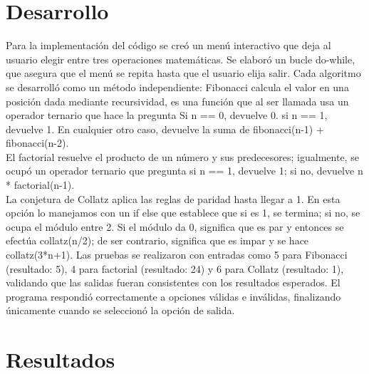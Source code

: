 \documentclass[letterpaper,12pt,oneside]{article}
\begin{document}
\section{Desarrollo}
Para la implementación del código se creó un menú interactivo que deja al usuario elegir entre tres operaciones matemáticas. Se elaboró un bucle do-while, que asegura que el menú se repita hasta que el usuario elija salir. Cada algoritmo se desarrolló como un método independiente: Fibonacci calcula el valor en una posición dada mediante recursividad, es una función que al ser llamada usa un operador ternario que hace la pregunta Si n == 0, devuelve 0. si n == 1, devuelve 1. En cualquier otro caso, devuelve la suma de fibonacci(n-1) + fibonacci(n-2). \\ 

El factorial resuelve el producto de un número y sus predecesores; igualmente, se ocupó un operador ternario que pregunta si n == 1, devuelve 1; si no, devuelve n * factorial(n-1). \\

La conjetura de Collatz aplica las reglas de paridad hasta llegar a 1. En esta opción lo manejamos con un if else que establece que si es 1, se termina; si no, se ocupa el módulo entre 2. Si el módulo da 0, significa que es par y entonces se efectúa collatz(n/2); de ser contrario, significa que es impar y se hace collatz(3*n+1). Las pruebas se realizaron con entradas como 5 para Fibonacci (resultado: 5), 4 para factorial (resultado: 24) y 6 para Collatz (resultado: 1), validando que las salidas fueran consistentes con los resultados esperados. El programa respondió correctamente a opciones válidas e inválidas, finalizando únicamente cuando se seleccionó la opción de salida. \\

\clearpage

\section{Resultados}
\end{document}

